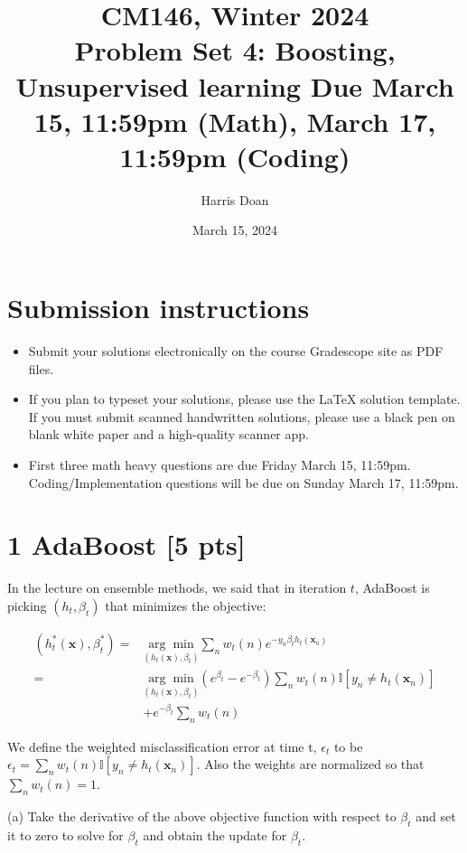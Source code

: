 \documentclass[10pt]{article}
\title{CM146, Winter 2024 \\
 Problem Set 4: Boosting, Unsupervised learning Due March 15, 11:59pm (Math), March 17, 11:59pm (Coding) }
\author{Harris Doan}
\date{March 15, 2024}
\begin{document}
\maketitle
\section*{Submission instructions}
\begin{itemize}
  \item Submit your solutions electronically on the course Gradescope site as PDF files.
  \item If you plan to typeset your solutions, please use the LaTeX solution template. If you must submit scanned handwritten solutions, please use a black pen on blank white paper and a high-quality scanner app.
  \item First three math heavy questions are due Friday March 15, 11:59pm. Coding/Implementation questions will be due on Sunday March 17, 11:59pm.
\end{itemize}

\section*{1 AdaBoost [5 pts]}
In the lecture on ensemble methods, we said that in iteration $t$, AdaBoost is picking $\left(h_{t}, \beta_{t}\right)$ that minimizes the objective:

$$
\begin{aligned}
\left(h_{t}^{*}(\boldsymbol{x}), \beta_{t}^{*}\right)= & \underset{\left(h_{t}(\boldsymbol{x}), \beta_{t}\right)}{\arg \min } \sum_{n} w_{t}(n) e^{-y_{n} \beta_{t} h_{t}\left(\boldsymbol{x}_{n}\right)} \\
= & \underset{\left(h_{t}(\boldsymbol{x}), \beta_{t}\right)}{\arg \min }\left(e^{\beta_{t}}-e^{-\beta_{t}}\right) \sum_{n} w_{t}(n) \mathbb{I}\left[y_{n} \neq h_{t}\left(\boldsymbol{x}_{n}\right)\right] \\
& +e^{-\beta_{t}} \sum_{n} w_{t}(n)
\end{aligned}
$$

We define the weighted misclassification error at time t, $\epsilon_{t}$ to be $\epsilon_{t}=\sum_{n} w_{t}(n) \mathbb{I}\left[y_{n} \neq h_{t}\left(\boldsymbol{x}_{n}\right)\right]$. Also the weights are normalized so that $\sum_{n} w_{t}(n)=1$.

(a) Take the derivative of the above objective function with respect to $\beta_{t}$ and set it to zero to solve for $\beta_{t}$ and obtain the update for $\beta_{t}$.
\end{document}

